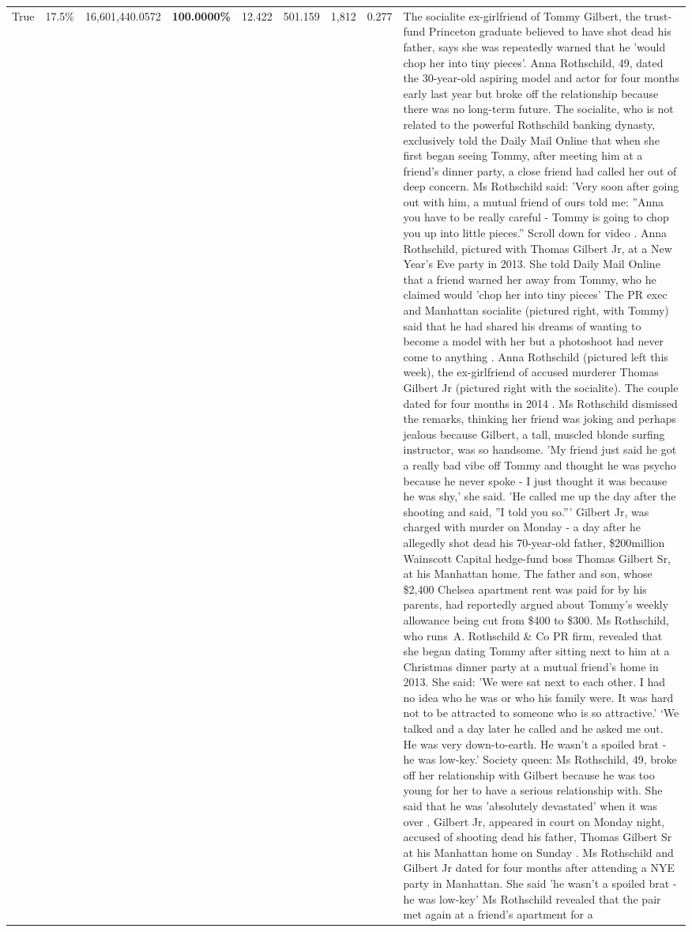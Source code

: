\begin{table}[H]
\begin{tabular}{lllrlllll}
True & 17.5\% & 16,601,440.0572 & \bfseries \color{red} 100.0000\% & 12.422 & 501.159 & 1,812 & 0.277 & The socialite ex-girlfriend of Tommy Gilbert, the trust-fund Princeton graduate believed to have shot dead his father, says she was repeatedly warned that he 'would chop her into tiny pieces'. Anna Rothschild, 49, dated the 30-year-old aspiring model and actor for four months early last year but broke off the relationship because there was no long-term future. The socialite, who is not related to the powerful Rothschild banking dynasty, exclusively told the Daily Mail Online that when she first began seeing Tommy, after meeting him at a friend's dinner party, a close friend had called her out of deep concern. Ms Rothschild said: 'Very soon after going out with him, a mutual friend of ours told me: ''Anna you have to be really careful - Tommy is going to chop you up into little pieces.'' Scroll down for video . Anna Rothschild, pictured with Thomas Gilbert Jr, at a New Year's Eve party in 2013. She told Daily Mail Online that a friend warned her away from Tommy, who he claimed would 'chop her into tiny pieces' The PR exec and Manhattan socialite (pictured right, with Tommy) said that he had shared his dreams of wanting to become a model with her but a photoshoot had never come to anything . Anna Rothschild (pictured left this week), the ex-girlfriend of accused murderer Thomas Gilbert Jr (pictured right with the socialite). The couple dated for four months in 2014 . Ms Rothschild dismissed the remarks, thinking her friend was joking and perhaps jealous because Gilbert, a tall, muscled blonde surfing instructor, was so handsome. 'My friend just said he got a really bad vibe off Tommy and thought he was psycho because he never spoke - I just thought it was because he was shy,' she said. 'He called me up the day after the shooting and said, ''I told you so.''' Gilbert Jr, was charged with murder on Monday - a day after he allegedly shot dead his 70-year-old father, \$200million Wainscott Capital hedge-fund boss Thomas Gilbert Sr, at his Manhattan home. The father and son, whose \$2,400 Chelsea apartment rent was paid for by his parents, had reportedly argued about Tommy's weekly allowance being cut from \$400 to \$300. Ms Rothschild, who runs A. Rothschild \& Co PR firm, revealed that she began dating Tommy after sitting next to him at a Christmas dinner party at a mutual friend's home in 2013. She said: 'We were sat next to each other. I had no idea who he was or who his family were. It was hard not to be attracted to someone who is so attractive.' ‘We talked and a day later he called and he asked me out. He was very down-to-earth. He wasn’t a spoiled brat - he was low-key.’ Society queen: Ms Rothschild, 49, broke off her relationship with Gilbert because he was too young for her to have a serious relationship with. She said that he was 'absolutely devastated' when it was over . Gilbert Jr, appeared in court on Monday night, accused of shooting dead his father, Thomas Gilbert Sr at his Manhattan home on Sunday . Ms Rothschild and Gilbert Jr dated for four months after attending a NYE party in Manhattan. She said 'he wasn't a spoiled brat - he was low-key' Ms Rothschild revealed that the pair met again at a friend’s apartment for a 
\end{tabular}
\end{table}
